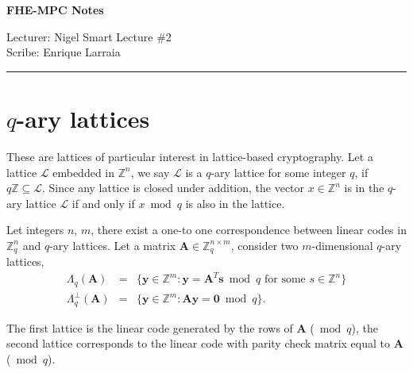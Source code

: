 \documentclass[11pt]{article}
\begin{document}
\thispagestyle{empty}


\begin{center}
\bf\large FHE-MPC Notes
\end{center}

\noindent
Lecturer: Nigel Smart    %
\hfill
Lecture \#2              %
\\
Scribe: Enrique Larraia  %
\hfill

\noindent
\rule{\textwidth}{1pt}

\medskip

\section*{$q$-ary lattices}
These are lattices of particular interest in lattice-based cryptography. Let a lattice $\mathcal{L}$ embedded in ${\mathbb{Z}}^n$, we say $\mathcal{L}$ is a $q$-ary lattice for some integer $q$, if  $q\mathbb{Z} \subseteq \mathcal{L}$. Since any lattice is closed under addition, the vector $x \in \mathbb{Z}^n$ is in the $q$-ary lattice $\mathcal{L}$ if and only if $x \bmod q$ is also in the lattice.

 Let integers $n$, $m$, there exist a one-to one correspondence between linear codes in ${\mathbb{Z}}_q^n$ and $q$-ary lattices. Let a matrix $\boldsymbol{A} \in \mathbb{Z}_q^{n \times m}$, consider two $m$-dimensional $q$-ary lattices,
\begin{eqnarray*}
  {\Lambda}_q (\boldsymbol{A} ) &=& \{ \boldsymbol{y} \in \mathbb{Z}^m : \boldsymbol{y} = \boldsymbol{A}^T\boldsymbol{s} \bmod q \text{ for some } s \in \mathbb{Z}^n \} \\
  {\Lambda}_q^{\bot} (\boldsymbol{A} ) &=& \{ \boldsymbol{y} \in \mathbb{Z}^m : \boldsymbol{A} \boldsymbol{y} = \boldsymbol{0} \bmod q \}.
\end{eqnarray*}

The first lattice is the linear code generated by the rows of $\boldsymbol{A}$ ($\bmod q$), the second lattice corresponds to the linear code with parity check matrix equal to $\boldsymbol{A}$ ($\bmod q$).
\end{document}
